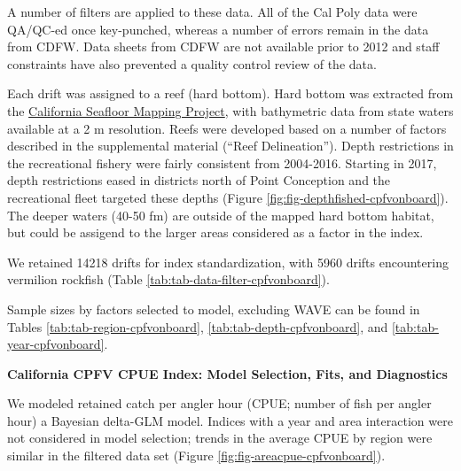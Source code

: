 \documentclass[11pt,
  english,
]{article}
\begin{document}
A number of filters are applied to these data. All of the Cal Poly data were QA/QC-ed once key-punched, whereas a number of errors remain in the data from CDFW. Data sheets from CDFW are not available prior to 2012 and staff constraints have also prevented a quality control review of the data.

Each drift was assigned to a reef (hard bottom). Hard bottom was extracted from the {\href{http://seafloor.otterlabs.org/index.html}{California Seafloor Mapping Project}\leavevmode\tagmcend\tagstructend}, with bathymetric data from state waters available at a 2 m resolution. Reefs were developed based on a number of factors described in the supplemental material (``Reef Delineation''). Depth restrictions in the recreational fishery were fairly consistent from 2004-2016. Starting in 2017, depth restrictions eased in districts north of Point Conception and the recreational fleet targeted these depths (Figure \ref{fig:fig-depthfished-cpfvonboard}). The deeper waters (40-50 fm) are outside of the mapped hard bottom habitat, but could be assigend to the larger areas considered as a factor in the index.

We retained 14218 drifts for index standardization, with 5960 drifts encountering vermilion rockfish (Table \ref{tab:tab-data-filter-cpfvonboard}).

Sample sizes by factors selected to model, excluding WAVE can be found in Tables \ref{tab:tab-region-cpfvonboard}, \ref{tab:tab-depth-cpfvonboard}, and \ref{tab:tab-year-cpfvonboard}.

\textbf{California CPFV CPUE Index: Model Selection, Fits, and Diagnostics}

We modeled retained catch per angler hour (CPUE; number of fish per angler hour) a Bayesian delta-GLM model. Indices with a year and area interaction were not considered in model selection; trends in the average CPUE by region were similar in the filtered data set (Figure \ref{fig:fig-areacpue-cpfvonboard}).
\end{document}
